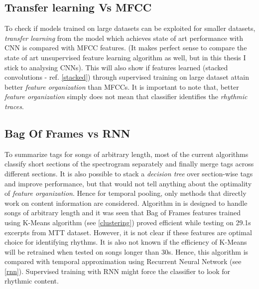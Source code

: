 \subsection{Transfer learning Vs MFCC}
\label{transfer}
To check if models trained on large datasets can be exploited for smaller datasets, \textit{transfer learning} from the model which achieves state of art performance with CNN\cite{choi_cnn} is compared with MFCC features. (It makes perfect sense to compare the state of art unsupervised feature learning algorithm\cite{MultiScale} as well, but in this thesis I stick to analysing CNNs). This will also show if features learned (stacked convolutions - ref. \ref{stacked}) through supervised training on large dataset attain better \textit{feature organization} than MFCCs. It is important to note that, better \textit{feature organization} simply does not mean that classifier identifies the \textit{rhythmic traces}.

\subsection{Bag Of Frames vs RNN}
\label{kmeans}
To summarize tags for songs of arbitrary length, most of the current algorithms classify short sections of the spectrogram separately and finally merge tags across different sections\cite{EndToEnd}. It is also possible to stack a \textit{decision tree} over section-wise tags and improve performance, but that would not tell anything about the optimality of \textit{feature organization}. Hence for temporal pooling, only methods that directly work on content information are considered. Algorithm in \cite{MultiScale} is designed to handle songs of arbitrary length and it was seen that Bag of Frames features trained using K-Means algorithm (see \ref{clustering}) proved efficient while testing on 29.1s excerpts from MTT dataset. However, it is not clear if these features are optimal choice for identifying rhythms.  It is also not known if the efficiency of K-Means will be retrained when tested on songs longer than 30s. Hence, this algorithm is compared with temporal approximation using Recurrent Neural Network (see \ref{rnn}). Supervised training with RNN might force the classifier to look for rhythmic content.    
        
 
 